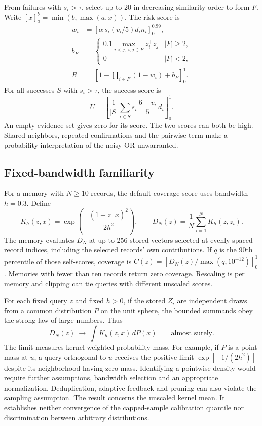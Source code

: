 From failures with $s_i>\tau$, select up to 20 in decreasing similarity
order to form $F$. Write $[x]_a^b=\min(b,\max(a,x))$. The risk score is
\begin{align}
 w_i &= [\alpha\,s_i(v_i/5)d_i n_i]_0^{0.99},\\
 b_F &=
 \begin{cases}
  0.1\max_{i<j,\ i,j\in F} z_i^\top z_j & |F|\geq 2,\\
  0 & |F|<2,
 \end{cases}\\
 R &= \left[1-\prod_{i\in F}(1-w_i)+b_F\right]_0^1 .
\end{align}
For all successes $S$ with $s_i>\tau$, the success score is
\[
 U=\left[\frac{1}{|S|}\sum_{i\in S}s_i\,\frac{6-v_i}{5}\,d_i\right]_0^1 .
\]
An empty evidence set gives zero for its score. The two scores can both be
high. Shared neighbors, repeated confirmations and the pairwise term make
a probability interpretation of the noisy-OR unwarranted.

\subsection{Fixed-bandwidth familiarity}

For a memory with $N\geq 10$ records, the default coverage score uses bandwidth
$h=0.3$. Define
\[
 K_h(z,x)=\exp\!\left(-\frac{(1-z^\top x)^2}{2h^2}\right),\qquad
 D_N(z)=\frac{1}{N}\sum_{i=1}^N K_h(z,z_i).
\]
The memory evaluates $D_N$ at up to 256 stored vectors selected at evenly
spaced record indices, including the selected records' own contributions.
If $q$ is the 90th percentile of those self-scores, coverage is
$C(z)=[D_N(z)/\max(q,10^{-12})]_0^1$. Memories with fewer than ten
records return zero coverage. Rescaling is per memory and clipping can tie
queries with different unscaled scores.

For each fixed query $z$ and fixed $h>0$, if the stored $Z_i$ are independent
draws from a common distribution $P$ on the unit sphere, the bounded summands
obey the strong law of large numbers. Thus
\[
 D_N(z)\ \longrightarrow\ \int K_h(z,x)\,dP(x)
 \qquad\text{almost surely}.
\]
The limit measures kernel-weighted probability mass. For example, if
$P$ is a point mass at $u$, a query orthogonal to $u$ receives the positive
limit $\exp[-1/(2h^2)]$ despite its neighborhood having zero mass.
Identifying a pointwise density would require further assumptions, bandwidth
selection and an appropriate normalization. Deduplication, adaptive feedback
and pruning can also violate the sampling assumption. The result concerns the
unscaled kernel mean. It establishes neither convergence of the capped-sample
calibration quantile nor discrimination between arbitrary distributions.

